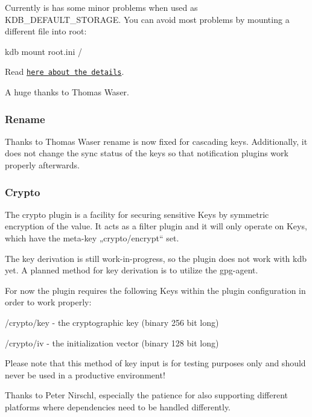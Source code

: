 Currently is has some minor problems when used as K\+D\+B\+\_\+\+D\+E\+F\+A\+U\+L\+T\+\_\+\+S\+T\+O\+R\+A\+GE. You can avoid most problems by mounting a different file into root\+: \begin{DoxyVerb}kdb mount root.ini /
\end{DoxyVerb}


Read \href{https://github.com/ElektraInitiative/libelektra/tree/master/src/plugins/ini}{\tt here about the details}.

A huge thanks to Thomas Waser.

\subsubsection*{Rename}

Thanks to Thomas Waser {\ttfamily rename} is now fixed for cascading keys. Additionally, it does not change the {\ttfamily sync} status of the keys so that notification plugins work properly afterwards.

\subsubsection*{Crypto}

The crypto plugin is a facility for securing sensitive Keys by symmetric encryption of the value. It acts as a filter plugin and it will only operate on Keys, which have the meta-\/key „crypto/encrypt“ set.

The key derivation is still work-\/in-\/progress, so the plugin does not work with kdb yet. A planned method for key derivation is to utilize the gpg-\/agent.

For now the plugin requires the following Keys within the plugin configuration in order to work properly\+:


\begin{DoxyEnumerate}
\item /crypto/key -\/ the cryptographic key (binary 256 bit long)
\item /crypto/iv -\/ the initialization vector (binary 128 bit long)
\end{DoxyEnumerate}

Please note that this method of key input is for testing purposes only and should never be used in a productive environment!

Thanks to Peter Nirschl, especially the patience for also supporting different platforms where dependencies need to be handled differently.

